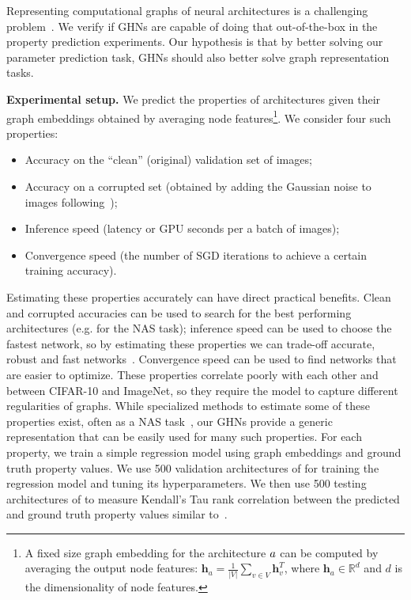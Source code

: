Representing computational graphs of neural architectures is a challenging problem~\citep{li2020neural,wen2019neural,jin2019auto,kriege2020survey,makarov2021survey}.
We verify if GHNs are capable of doing that out-of-the-box in the property prediction experiments. %
Our hypothesis is that by better solving our parameter prediction task, GHNs should also better solve graph representation tasks.

\textbf{Experimental setup.}
We predict the properties of architectures given their graph embeddings obtained by averaging node features\footnote{A fixed size graph embedding for the architecture $a$ can be computed by averaging the output node features: $\mathbf{h}_{a}=\frac{1}{|V|} \sum_{v \in V} \mathbf{h}_v^T$, where $\mathbf{h}_a \in \mathbb{R}^d$ and $d$ is the dimensionality of node features.
}.
We consider four such properties: %
\begin{itemize}%
	\setlength\itemsep{0em}
	\item Accuracy on the ``clean'' (original) validation set of images;
	\item Accuracy on a corrupted set (obtained by adding the Gaussian noise to images following~\citep{hendrycks2019benchmarking});
	\item Inference speed (latency or GPU seconds per a batch of images);
	\item Convergence speed (the number of SGD iterations to achieve a certain training accuracy).
\end{itemize}
\vspace{-3pt}

Estimating these properties accurately can have direct practical benefits. Clean and corrupted accuracies can be used to search for the best performing architectures (e.g. for the NAS task); inference speed can be used to choose the fastest network, so by estimating these properties we can trade-off accurate, robust and fast networks~\citep{cai2019onceforall}. Convergence speed can be used to find networks that are easier to optimize.
These properties correlate poorly with each other and between CIFAR-10 and ImageNet, 
so they require the model to capture different regularities of graphs. 
While specialized methods to estimate some of these properties exist, often as a NAS task~\citep{wen2020neural,lukasik2020neural,baker2017accelerating,liu2018progressive,li2020neural}, our GHNs provide a generic representation that can be easily used for many such properties.
For each property, we train a simple regression model using graph embeddings and ground truth property values. We use 500 validation architectures of \dataset for training the regression model and tuning its hyperparameters.
We then use 500 testing architectures of \dataset to measure Kendall's Tau rank correlation between the predicted and ground truth property values similar to~\citep{wen2020neural}.


